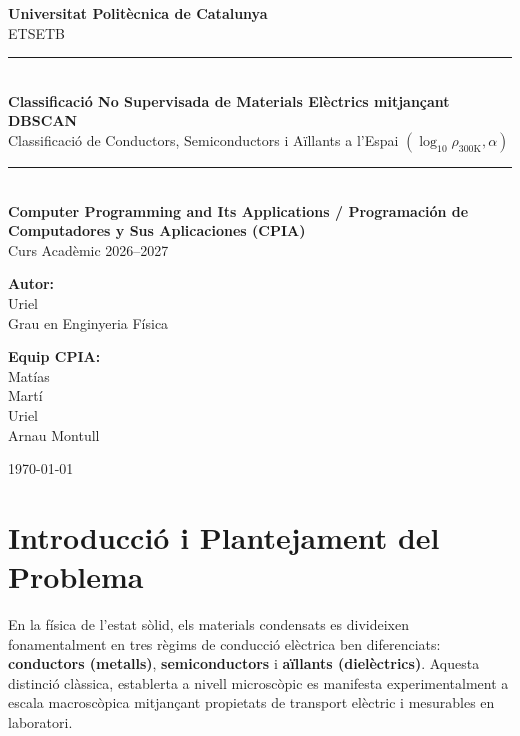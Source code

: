 \documentclass[a4paper,11pt]{article}
\newcommand{\titol}{Classificació No Supervisada de Materials Elèctrics mitjançant DBSCAN}
\newcommand{\subtitol}{Classificació de Conductors, Semiconductors i Aïllants a l'Espai $(\log_{10}\rho_{300\mathrm{K}}, \alpha)$}
\newcommand{\assignatura}{Computer Programming and Its Applications / Programación de Computadores y Sus Aplicaciones (CPIA)}
\newcommand{\universitat}{Universitat Politècnica de Catalunya}
\newcommand{\escola}{ETSETB}
\newcommand{\autor}{Uriel}
\newcommand{\titulacio}{Grau en Enginyeria Física}
\begin{document}
\begin{titlepage}
    \thispagestyle{empty}
    \centering
    \vspace*{0.5cm}
    
    {\large \textbf{\universitat}}\\[0.15cm]
    {\normalsize \escola}\\[1.0cm]
    
    \rule{\textwidth}{0.8pt}\\[0.4cm]
    {\LARGE \textbf{\titol}}\\[0.3cm]
    {\large \subtitol}\\[0.2cm]
    \rule{\textwidth}{0.8pt}\\[1.0cm]
    
    {\large \textbf{\assignatura}}\\[0.2cm]
    {\normalsize Curs Acadèmic 2026--2027}\\[1.4cm]
    
    \begin{minipage}{0.48\textwidth}
        \raggedright
        \textbf{Autor:}\\
        {\large \autor}\\[0.1cm]
        \titulacio
    \end{minipage}
    \begin{minipage}{0.48\textwidth}
        \raggedleft
        \textbf{Equip CPIA:}\\
        Matías\\
        Martí\\
        Uriel\\
        Arnau Montull
    \end{minipage}
    
    \vfill
    {\normalsize \today}
\end{titlepage}

\clearpage

\tableofcontents
\clearpage

\section{Introducció i Plantejament del Problema}

En la física de l'estat sòlid, els materials condensats es divideixen fonamentalment en tres règims de conducció elèctrica ben diferenciats: \textbf{conductors (metalls)}, \textbf{semiconductors} i \textbf{aïllants (dielèctrics)}. Aquesta distinció clàssica, establerta a nivell microscòpic es manifesta experimentalment a escala macroscòpica mitjançant propietats de transport elèctric i mesurables en laboratori.
\end{document}
